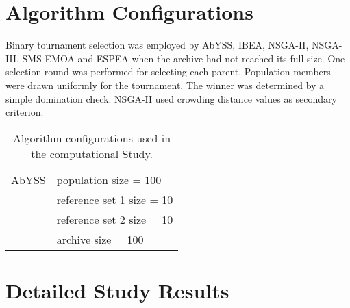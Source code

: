 \appendix

\section{Algorithm Configurations}
\label{sec:algosetup}
Binary tournament selection was employed by AbYSS, IBEA, NSGA-II, NSGA-III, SMS-EMOA and ESPEA when the archive had not reached its full size. One selection round was performed for selecting each parent. Population members were drawn uniformly for the tournament. The winner was determined by a simple domination check. NSGA-II used crowding distance values as secondary criterion.

\begin{table}
\caption{Algorithm configurations used in the computational Study.}
\centering
\begin{tabular}{ll} \toprule
AbYSS & population size = 100 \\
& reference set 1 size = 10 \\
& reference set 2 size = 10 \\
& archive size = 100 \\
\end{tabular}
\end{table}

\section{Detailed Study Results}

